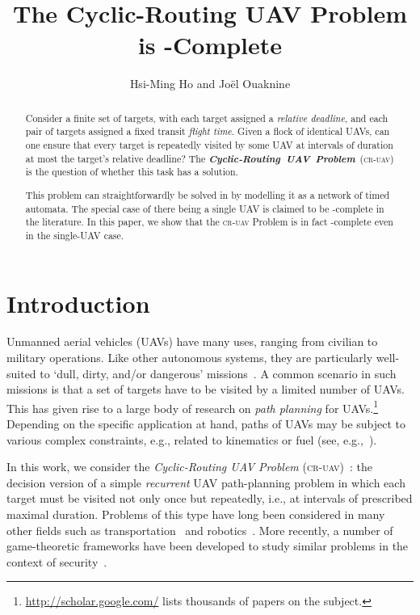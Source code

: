 \documentclass[envcountsame]{llncs}
\title{The Cyclic-Routing UAV Problem is -Complete}
\author{Hsi-Ming Ho and Jo\"el Ouaknine}
\institute{Department of Computer Science, University of Oxford \\ Wolfson Building, Parks Road, Oxford, OX1 3QD, UK}
\begin{document}
\maketitle
\thispagestyle{plain}
\begin{abstract}
Consider a finite set of targets, with each target assigned a
\emph{relative deadline}, and each pair of targets assigned a fixed
transit \emph{flight time}. Given a flock of identical UAVs, can
one ensure that every target is repeatedly visited by some UAV at
intervals of duration at most the target's relative deadline? The
\mbox{\emph{\textbf{Cyclic-Routing UAV Problem}} \textsc{(cr-uav)}} is the question of
whether this task has a solution.

This problem can straightforwardly be solved in  by
modelling it as a network of timed automata. The special case of there
being a single UAV is claimed to be -complete in the
literature. In this paper, we show that the \textsc{cr-uav} Problem is in
fact -complete even in the single-UAV case.
\end{abstract}

\section{Introduction}

Unmanned aerial vehicles (UAVs) have many uses, ranging from civilian
to military operations. Like other autonomous systems, they are
particularly well-suited to `dull, dirty, and/or dangerous'
missions~\cite{UAVS}.  A common scenario in such missions is that a
set of targets have to be visited by a limited number of UAVs.  This
has given rise to a large body of research on \emph{path planning} for
UAVs.\footnote{\url{http://scholar.google.com/} lists thousands of papers on the subject.} Depending on the specific application at hand, paths of UAVs
may be subject to various complex constraints, e.g., related to kinematics or
fuel (see, e.g.,~\cite{Alighanbari2003, Elizabeth2012, Yang2002,
  Richards2002}).


In this work, we consider the \emph{Cyclic-Routing UAV Problem} (\textsc{cr-uav})~\cite{Drucker2010}:
the decision version of a simple \emph{recurrent}
UAV path-planning problem in which each target must be visited not only
once but repeatedly, i.e., at intervals of prescribed maximal duration. 
Problems of this type have long been considered in many other fields
such as transportation~\cite{Orlin1982, Wollmer1990} and
robotics~\cite{Crama1997, Kats1997}.  More recently, a number of
game-theoretic frameworks have been developed to study similar
problems in the context of security~\cite{Tsai2009, Jain2010,
  Basilico2012}.
\end{document}

